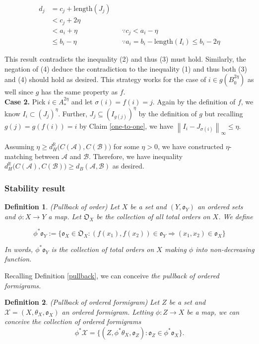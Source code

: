 \documentclass[a4paper,12pt]{article}
\newtheorem{definition}{Definition}[section]
\newcommand{\length}[1]{\mathrm{length}(#1)}
\newcommand{\norm}[1]{\left\lVert#1\right\rVert}
\begin{document}
\begin{align*}
d_j&=c_j+\length{J_j}
\\&< c_j+2\eta
\\&<a_i+\eta && \because c_j<a_i-\eta 
\\&\leq b_i-\eta && \because a_i=b_i-\length{I_i}\leq b_i-2\eta
\end{align*}

This result contradicts the inequality (2) and thus (3) must hold. Similarly, the negation of (4) deduce the contradiction to the inequality (1) and thus both (3) and (4) should hold as desired. This strategy  works for the case of $i\in g(B^{2\eta}_0)$ as well since $g$ has the same property as $f$.\\

\noindent\textbf{Case 2.} Pick $i\in A_*^{2\eta}$ and let $\sigma(i)=f(i)=j$. Again by the definition of $f$, we know $I_i\subset (J_j)^\eta$. Further, $J_j\subseteq (I_{g(j)})^\eta$ by the definition of $g$ but recalling $g(j)=g(f(i))=i$ by Claim \ref{one-to-one}, we have  $\norm{I_i-J_{\sigma(i)}}_{\infty}\leq \eta$. 

Assuming $\eta\geq d_{H}^\mathbb{R}\big(C(\mathcal{A}),C(\mathcal{B})\big)$ for some $\eta>0$, we have constructed $\eta$-matching between $\mathcal{A}$ and $\mathcal{B}$.  Therefore, we have inequality $d_{H}^\mathbb{R}\big(C(\mathcal{A}),C(\mathcal{B})\big)\geq d_B(\mathcal{A}, \mathcal{B})$ as desired.


\subsubsection{Stability result}

\begin{definition}(Pullback of order) Let $X$ be a set and $(Y,\mathfrak{o}_Y)$ an ordered sets and $\phi:X\rightarrow Y$ a map. Let $\mathfrak{O}_X$ be the collection of all total orders on $X$. We define

$$\phi^*\mathfrak{o}_Y:=\{\mathfrak{o}_X\in \mathfrak{O}_X: (f(x_1), f(x_2))\in \mathfrak{o}_Y \Rightarrow  (x_1,  x_2)\in \mathfrak{o}_X\}$$

In words, $\phi^*\mathfrak{o}_Y$ is the collection of total orders on $X$ making $\phi$ into non-decreasing function.
\end{definition}

Recalling Definition \ref{pullback}, we can conceive \emph{the pullback of ordered formigrams.}

\begin{definition}(Pullback of ordered formigram) Let $Z$ be a set and $\mathcal{X} = (X,\theta_X, \mathfrak{o}_X)$ an ordered formigram. Letting $\phi:Z\rightarrow X$ be a map, we can conceive the collection of ordered formigrams $$\phi^*\mathcal{X}=\{(Z,\phi^*\theta_X,\mathfrak{o}_Z): \mathfrak{o}_Z \in \phi^*\mathfrak{o}_X\}.$$
\end{definition}
\end{document}
